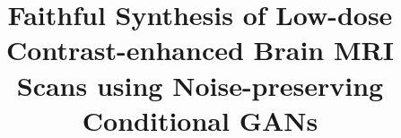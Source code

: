 \documentclass[a4paper,10pt]{article}
\begin{document}
%
\title{Faithful Synthesis of Low-dose Contrast-enhanced Brain MRI Scans using Noise-preserving Conditional GANs}
\date{}

\renewcommand{\shorttitle}{Synthesis of Low-dose Contrast-enhanced Brain MRI Scans using CGANs}

%
%
\end{document}
